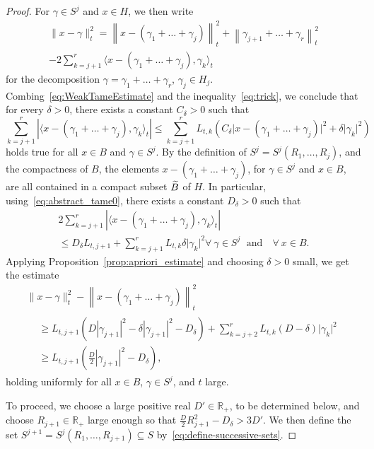 \documentclass[10pt,a4paper]{amsart}
\newcommand{\innone}[2]{{\langle#2\rangle_{#1}}}
\newcommand{\normsq}[1]{\|#1\|^{2}}
\newcommand{\normbsq}[1]{\left\|#1\right\|^{2}}
\newcommand{\refnormsq}[1]{\lvert#1\rvert^{2}}
\newcommand{\refnormbsq}[1]{\left\lvert#1\right\rvert^{2}}
\newcommand{\abss}[1]{\left\lvert #1\right\rvert}
\newcommand{\R}{\mathbb{R}}
\let\oldtilde\tilde
\renewcommand*{\tilde}[1]{\mathchoice{\widetilde{#1}}{\widetilde{#1}}{\oldtilde{#1}}{\oldtilde{#1}}}
\let\oldforall\forall
\renewcommand*{\forall}{\mathrel{\oldforall}}
\theoremstyle{definition}\newtheorem{defi}[cdrthm]{Definition}
\begin{document}
\begin{proof}
For $\gamma \in S^j$ and $x \in H$, we then write
\begin{multline*}
\normsq{x - \gamma}_t = \normbsq{x-(\gamma_1 + \dots +\gamma_j)}_t + \normbsq{\gamma_{j+1} + \dots + \gamma_r}_t\\
- 2\sum_{k = j+1}^r \innone{t}{x- (\gamma_1 + \dots + \gamma_j), \gamma_k}
\end{multline*}
for the decomposition $\gamma = \gamma_1 + \dots + \gamma_r$, $\gamma_j\in H_j$. Combing~\eqref{eq:WeakTameEstimate} and the inequality~\eqref{eq:trick}, we conclude that for every $\delta >0$, there exists a constant $C_\delta >0$ such that
\[
\sum_{k = j+1}^r \abss{\innone{t}{x- (\gamma_1 + \dots + \gamma_j), \gamma_k}} \le \sum_{k =j+1}^r L_{t,k} \left(C_\delta \refnormsq{x- (\gamma_1 + \dots + \gamma_j)} + \delta \refnormsq{\gamma_k}\right)
\]
holds true for all $x\in B$ and $\gamma \in S^j$. By the definition of $S^j = S^j(R_1, \dots, R_j)$, and the compactness of $B$, the elements $x - (\gamma_1+ \dots+\gamma_j)$, for $\gamma \in S^j$ and $x \in B$,\pagebreak{} are all contained in a compact subset $\tilde{B}$ of $H$. In particular, using~\eqref{eq:abstract_tame0}, there exists a constant $D_\delta >0$ such that
\begin{multline*}
2 \sum_{k = j+1}^r \abss{\innone{t}{x- (\gamma_1 + \dots + \gamma_j), \gamma_k}}\\
\le D_\delta L_{t,j+1} + \sum_{k =j+1}^r L_{t,k} \delta \refnormsq{\gamma_k}
\forall \: \gamma \in S^j \;\text{ and}\quad \forall \: x\in B.
\end{multline*}
Applying Proposition~\ref{prop:apriori_estimate} and choosing $\delta >0$ small, we get the estimate
\begin{multline}\label{eq:estimate-induction1}
\normsq{x - \gamma}_t - \normbsq{x-(\gamma_1 + \dots +\gamma_j)}_t\\
\begin{aligned}
&\ge L_{t,j+1} \left(D \refnormbsq{\gamma_{j+1}} - \delta \refnormbsq{\gamma_{j+1}} - D_\delta \right) + \sum_{k=j+2}^r L_{t,k} (D - \delta) \refnormsq{\gamma_k} \\
& \ge L_{t,j+1} \left(\frac{D}{2} \refnormbsq{\gamma_{j+1}} - D_\delta\right),
\end{aligned}
\end{multline}
holding uniformly for all $x \in B$, $\gamma \in S^j$, and $t$ large.

To proceed, we choose a large positive real $D' \in\R_+$, to be determined below, and choose $R_{j+1} \in \R_+$ large enough so that $\frac{D}{2} R_{j+1}^2 - D_\delta >3D'$. We then define the set $S^{j+1} = S^j(R_1, \dots, R_{j+1}) \subseteq S$ by~\eqref{eq:define-successive-sets}.




\end{proof}
\end{document}
